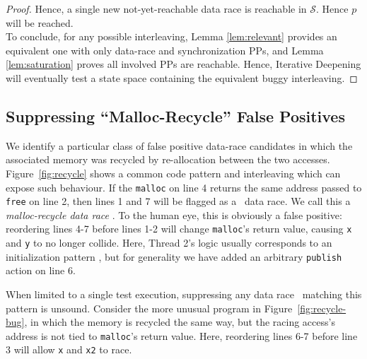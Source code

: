 \begin{proof}
Hence, a single new not-yet-reachable data race is reachable in $\mathcal{S}$. Hence $p$ will be reached.
\\

To conclude,
for any possible interleaving, Lemma \ref{lem:relevant} provides an equivalent one with only data-race and synchronization PPs,
and Lemma \ref{lem:saturation} proves all involved PPs are reachable.
Hence, Iterative Deepening will eventually test a state space containing the equivalent buggy interleaving.
\end{proof}


\subsection{Suppressing ``Malloc-Recycle'' False Positives}
\label{sec:recycle}

We identify a particular class of false positive data-race candidates  in which the associated memory was recycled by re-allocation between the two accesses.
Figure~\ref{fig:recycle} shows a common code pattern and interleaving which can expose such behaviour.
If the {\tt malloc} on line 4 returns the same address passed to {\tt free} on line 2, then lines 1 and 7 will be flagged as a ~data race.
We call this a {\em malloc-recycle data race }.
To the human eye, this is obviously a false positive: reordering lines 4-7 before lines 1-2 will change {\tt malloc}'s return value, causing {\tt x} and {\tt y} to no longer collide.
Here, Thread 2's logic usually corresponds to an initialization pattern \cite{eraser}, but for generality we have added an arbitrary {\tt publish} action on line 6.

When limited to a single test execution, suppressing any data race ~matching this pattern is unsound.
Consider the more unusual program in Figure~\ref{fig:recycle-bug},
in which the memory is recycled the same way, but the racing access's address is not tied to {\tt malloc}'s return value.
Here, reordering lines 6-7 before line 3 will allow {\tt x} and {\tt x2} to race.

